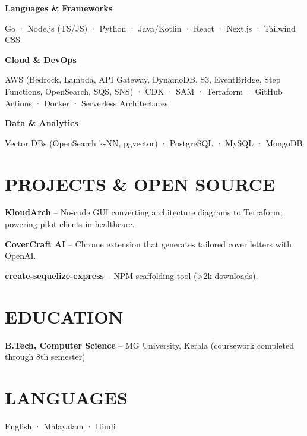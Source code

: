 \documentclass[11pt]{article}
\begin{document}
\textbf{Languages \& Frameworks}

Go · Node.js (TS/JS) · Python · Java/Kotlin · React · Next.js · Tailwind CSS

\textbf{Cloud \& DevOps}

AWS (Bedrock, Lambda, API Gateway, DynamoDB, S3, EventBridge, Step Functions, OpenSearch, SQS, SNS) · CDK · SAM · Terraform · GitHub Actions · Docker · Serverless Architectures

\textbf{Data \& Analytics}

Vector DBs (OpenSearch k-NN, pgvector) · PostgreSQL · MySQL · MongoDB

\section*{PROJECTS \& OPEN SOURCE}

\textbf{KloudArch} -- No-code GUI converting architecture diagrams to Terraform; powering pilot clients in healthcare.

\textbf{CoverCraft AI} -- Chrome extension that generates tailored cover letters with OpenAI.

\textbf{create-sequelize-express} -- NPM scaffolding tool (>2k downloads).

\section*{EDUCATION}

\textbf{B.Tech, Computer Science} -- MG University, Kerala (coursework completed through 8th semester)

\section*{LANGUAGES}

English · Malayalam · Hindi
\end{document}
